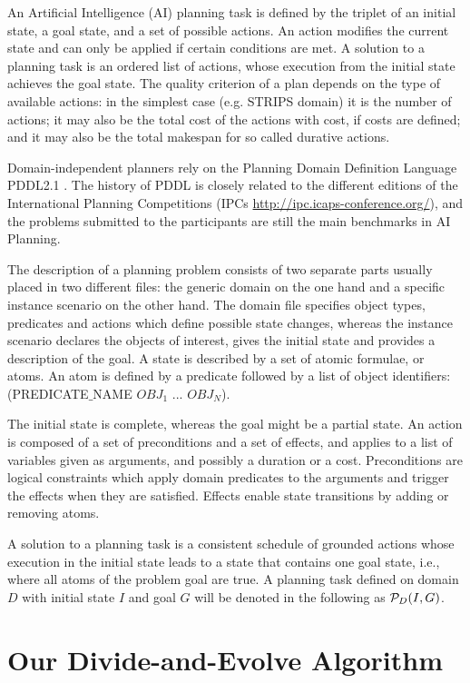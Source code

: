 \documentclass{acm_proc_article-sp}
\begin{document}
An Artificial Intelligence (AI) planning task is defined by the triplet of an initial state, a goal state, and a set of possible actions. An action modifies the current state and can only be applied if certain conditions are met. A solution to a planning task is an ordered list of actions, whose execution from the initial state achieves the goal state. The quality criterion of a plan depends on the type of available actions: in the simplest case (e.g. STRIPS domain) it is the number of actions; it may also be the total cost of the actions with cost, if costs are defined; and it may also be the total makespan for so called durative actions.

Domain-independent planners rely on the Planning Domain Definition Language PDDL2.1 \cite{Fox-JAIR-2003}. The history of PDDL is closely related to the different editions of the International Planning Competitions (IPCs \url{http://ipc.icaps-conference.org/}), and the problems submitted to the participants are still the main benchmarks in AI Planning.

The description of a planning problem consists of two separate parts usually placed in two different files: the generic domain on the one hand and a specific instance scenario on the other hand. The domain file specifies object types, predicates and actions which define possible state changes, whereas the instance scenario declares the objects of interest, gives the initial state and provides a description of the goal. A state is described by a set of atomic formulae, or atoms. An atom is defined by a predicate followed by a list of object identifiers: (PREDICATE$\_$NAME $OBJ_1$ ... $OBJ_N$). 

The initial state is complete, whereas the goal might be a partial state. An action is composed of a set of preconditions and a set of effects, and applies to a list of variables given as arguments, and possibly a duration or a cost. Preconditions are logical constraints which apply domain predicates to the arguments and trigger the effects when they are satisfied. Effects enable state transitions by adding or removing atoms.

A solution to a planning task is a consistent schedule of grounded actions whose execution in the initial state leads to a state that contains one goal state, i.e., where all atoms of the problem goal are true. A planning task defined on domain $D$ with initial state $I$ and goal $G$ will be denoted in the following as ${\cal P}_D(I,G)$.

\section{Our Divide-and-Evolve Algorithm}
\label{section:dae}
\end{document}
